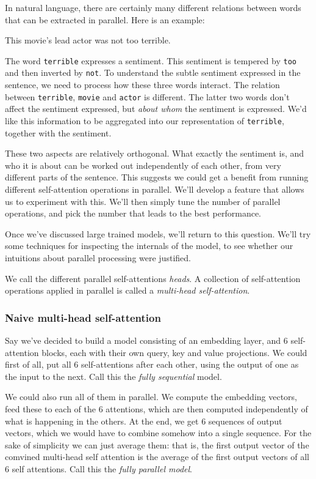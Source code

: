 \documentclass{pca}
\theoremstyle{theorem}
\theoremstyle{definition}
\theoremstyle{proof}
\begin{document}
In natural language, there are certainly many different relations between words that can be extracted in parallel. Here is an example:


This movie's lead actor was not too terrible.	


The word \texttt{terrible} expresses a sentiment. This sentiment is tempered by \texttt{too} and then inverted by \texttt{not}. To understand the subtle sentiment expressed in the sentence, we need to process how these three words interact. The relation between \texttt{terrible}, \texttt{movie} and \texttt{actor} is different. The latter two words don't affect the sentiment expressed, but \emph{about whom} the sentiment is expressed. We'd like this information to be aggregated into our representation of \texttt{terrible}, together with the sentiment.

These two aspects are relatively orthogonal. What exactly the sentiment is, and who it is about can be worked out independently of each other, from very different parts of the sentence. This suggests we could get a benefit from running different self-attention operations in parallel. We'll develop a feature that allows us to experiment with this. We'll then simply tune the number of parallel operations, and pick the number that leads to the best performance.

 Once we've discussed large trained models, we'll return to this question. We'll try some techniques for inspecting the internals of the model, to see whether our intuitions about parallel processing were justified.

We call the different parallel self-attentions \emph{heads}. A collection of self-attention operations applied in parallel is called a \emph{multi-head self-attention}.

\subsubsection{Naive multi-head self-attention}

Say we've decided to build a model consisting of an embedding layer, and 6 self-attention blocks, each with their own query, key and value projections. We could first of all, put all 6 self-attentions after each other, using the output of one as the input to the next. Call this the \emph{fully sequential} model.

We could also run all of them in parallel. We compute the embedding vectors, feed these to each of the 6 attentions, which are then computed independently of what is happening in the others. At the end, we get 6 sequences of output vectors, which we would have to combine somehow into a single sequence. For the sake of simplicity we can just average them: that is, the first output vector of the comvined multi-head self attention is the average of the first output vectors of all 6 self attentions. Call this the \emph{fully parallel model}. 
\end{document}
